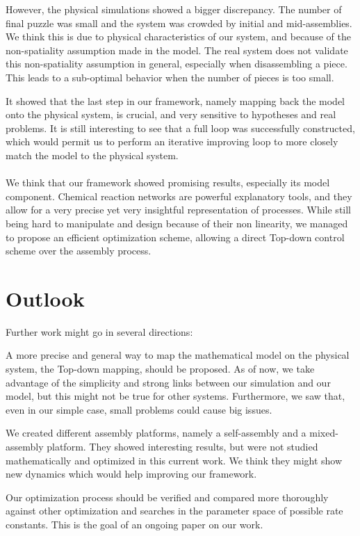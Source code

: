 	However, the physical simulations showed a bigger discrepancy. The number of final puzzle was small and the system was crowded by initial and mid-assemblies. We think this is due to physical characteristics of our system, and because of the non-spatiality assumption made in the model. The real system does not validate this non-spatiality assumption in general, especially when disassembling a piece. This leads to a sub-optimal behavior when the number of pieces is too small.
	
	It showed that the last step in our framework, namely mapping back the model onto the physical system, is crucial, and very sensitive to hypotheses and real problems. It is still interesting to see that a full loop was successfully constructed, which would permit us to perform an iterative improving loop to more closely match the model to the physical system.

	\paragraph{}
	We think that our framework showed promising results, especially its model component. Chemical reaction networks are powerful explanatory tools, and they allow for a very precise yet very insightful representation of processes. While still being hard to manipulate and design because of their non linearity, we managed to propose an efficient optimization scheme, allowing a direct Top-down control scheme over the assembly process.
	

\section{Outlook} %
\label{sec:outlook}

	Further work might go in several directions:
	
	\begin{my_enumerate}
		\item A more precise and general way to map the mathematical model on the physical system, the Top-down mapping, should be proposed. As of now, we take advantage of the simplicity and strong links between our simulation and our model, but this might not be true for other systems. Furthermore, we saw that, even in our simple case, small problems could cause big issues.
		\item We created different assembly platforms, namely a self-assembly and a mixed-assembly platform. They showed interesting results, but were not studied mathematically and optimized in this current work. We think they might show new dynamics which would help improving our framework.
		\item Our optimization process should be verified and compared more thoroughly against other optimization and searches in the parameter space of possible rate constants. This is the goal of an ongoing paper on our work.
	\end{my_enumerate}
	
